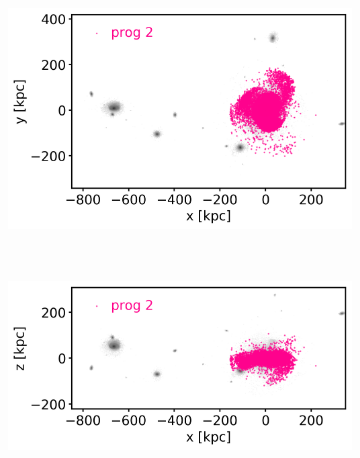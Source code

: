 \begin{figure}[htbp]
\captionsetup{format=plain}

    \centering
    \begin{subfigure}[c]{0.48\textwidth}
    \centering
    	\includegraphics[width=\textwidth]{plots/Dynamics/dist/xy_dist_wodisk_GCs_prog_2_snap_127.png}
    	\label{fig:prog2_xy}
    \end{subfigure}
    ~ %
    \begin{subfigure}[c]{0.48\textwidth}
        \centering
    	\includegraphics[width=\textwidth]{plots/Dynamics/dist/xz_dist_wodisk_GCs_prog_2_snap_127.png}
	    \label{fig:prog2_xz}
    \end{subfigure}
    

\end{figure}
